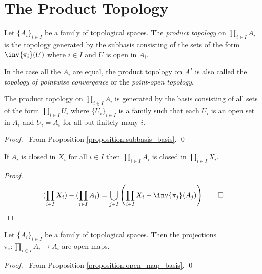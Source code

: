 \section{The Product Topology}

\begin{definition}
    Let $\{ A_i \}_{i \in I}$ be a family of topological spaces. The \emph{product topology} on $\prod_{i \in I} A_i$
    is the topology generated by the subbasis consisting of the sets of the form $\inv{\pi_i}(U)$ where $i \in I$
    and $U$ is open in $A_i$.

    In the case all the $A_i$ are equal, the product topology on $A^I$ is also called the \emph{topology of pointwise convergence}
    or the \emph{point-open topology}.
\end{definition}

\begin{proposition}
    \label{proposition:product_basis}
    The product topology on $\prod_{i \in I} A_i$ is generated by the basis consisting of all sets of the form $\prod_{i \in I} U_i$
    where $\{ U_i \}_{i \in I}$ is a family such that each $U_i$ is an open set in $A_i$ and $U_i = A_i$ for all but finitely many $i$.
\end{proposition}

\begin{proof}
    \pf\ From Proposition \ref{proposition:subbasis_basis}. \qed
\end{proof}

\begin{proposition}
    \label{proposition:closed_product}
    If $A_i$ is closed in $X_i$ for all $i \in I$ then $\prod_{i \in I} A_i$ is closed in $\prod_{i \in I} X_i$.
\end{proposition}

\begin{proof}
    \pf
    \[ (\prod_{i \in I} X_i) - (\prod_{i \in I} A_i) = \bigcup_{j \in I} \left( \prod_{i \in I} X_i - \inv{\pi_j}(A_j) \right) \qed \]
\end{proof}

\begin{proposition}
    \label{proposition:open_map_projections}
    Let $\{ A_i \}_{i \in I}$ be a family of topological spaces. Then the projections $\pi_i : \prod_{i \in I} A_i \rightarrow A_i$ are open maps.
\end{proposition}

\begin{proof}
    \pf\ From Proposition \ref{proposition:open_map_basis}. \qed
\end{proof}


